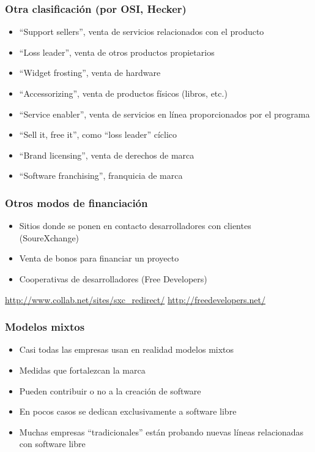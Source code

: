 \begin{frame}
\frametitle{Otra clasificación (por OSI, Hecker)}

\begin{itemize}
\item ``Support sellers'', venta de servicios relacionados
  con el producto
\item ``Loss leader'',  venta de otros productos propietarios
\item ``Widget frosting'', venta de hardware
\item ``Accessorizing'', venta de productos físicos (libros, etc.)
\item ``Service enabler'', venta de servicios en línea proporcionados
  por el programa
\item ``Sell it, free it'', como ``loss leader'' cíclico
\item ``Brand licensing'', venta de derechos de marca
\item ``Software franchising'', franquicia de marca
\end{itemize}

\end{frame}


\begin{frame}
\frametitle{Otros modos de financiación}

\begin{itemize}
\item Sitios donde se ponen en contacto desarrolladores con clientes
  (SoureXchange)
\item Venta de bonos para financiar un proyecto
\item Cooperativas de desarrolladores (Free Developers)
\end{itemize}

\begin{flushright}
\url{http://www.collab.net/sites/sxc_redirect/}
\url{http://freedevelopers.net/}
\end{flushright}

\end{frame}


\begin{frame}
\frametitle{Modelos mixtos}

\begin{itemize}
\item Casi todas las empresas usan en realidad modelos mixtos
\item Medidas que fortalezcan la marca
\item Pueden contribuir o no a la creación de software
\item En pocos casos se dedican exclusivamente a software libre
\item Muchas empresas ``tradicionales'' están probando nuevas líneas
  relacionadas con software libre
\end{itemize}

\end{frame}

